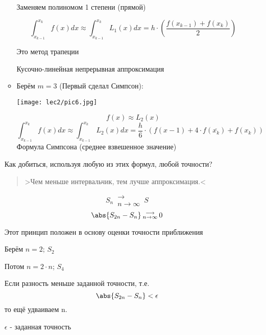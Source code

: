 \documentclass[12pt]{article}
\begin{document}
\begin{itemize}
\begin{itemize}
            Заменяем полиномом 1 степени (прямой)

            \[
              \int_{x_{k-1}}^{x_k} f(x)dx \approx
              \int_{x_{k-1}}^{x_k} L_1(x)dx =
              h \cdot \left( \frac{f(x_{k-1}) + f(x_k)}{2} \right)
            \] 

            Это метод трапеции

            Кусочно-линейная непрерывная аппроксимация

          \item Берём \( m=3 \) (Первый сделал Симпсон):

            \begin{center}
              \texttt{[image: lec2/pic6.jpg]}
            \end{center}

            \[
              f(x) \approx L_2(x)
            \] 
            \[
              \int_{x_{k-1}}^{x_k} f(x)dx \approx
              \int_{x_{k-1}}^{x_k} L_2(x)dx =
              \frac{h}{6} \cdot (f(x-1) + 4 \cdot f(\overline{x_k}) + f(x_k))
            \] 
            Формула Симпсона (среднее взвешенное значение)

        \end{itemize}
        Как добиться, используя любую из этих формул, любой точности?  
        \begin{quotation}
          \centering
          >Чем меньше интервальчик, тем лучше аппроксимация.<
        \end{quotation}
        \[
          S_n \hspace{2pt} \substack{\longrightarrow \\ n \to \infty}
          \hspace{2pt} S
        \] 
        \[
          \abs{S_{2n} - S_n} \hspace{2pt}
          \substack{\longrightarrow \\ n \to \infty}
          \hspace{2pt} 0
        \] 

        Этот принцип положен в основу оценки точности приближения
        
        Берём \( n=2 \); \( S_2 \)

        Потом \( n=2 \cdot n \); \( S_4 \)

        Если разность меньше заданной точности, т.е.
        \[
          \abs{S_{2n} - S_n} < \epsilon
        \] 
        то ещё удваиваем n.

        \( \epsilon \) - заданная точность


\end{itemize}
\end{document}
